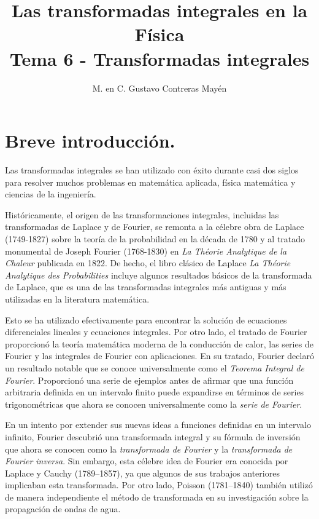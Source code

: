 
\usepackage{apacite}
\title{Las transformadas integrales en la Física \\ \large {Tema 6 - Transformadas integrales} \vspace{-3ex}}
\author{M. en C. Gustavo Contreras Mayén}
\date{ }

\vspace{-4cm}
\maketitle
\fontsize{14}{14}\selectfont
\tableofcontents
\newpage
\section{Breve introducción.}
Las transformadas integrales se han utilizado con éxito durante casi dos siglos para resolver muchos problemas en matemática aplicada, física matemática y ciencias de la ingeniería.
\par
Históricamente, el origen de las transformaciones integrales, incluidas las transformadas de Laplace y de Fourier, se remonta a la célebre obra de Laplace (1749-1827) sobre la teoría de la probabilidad en la década de 1780 y al tratado monumental de Joseph Fourier (1768-1830) en \emph{La Théorie Analytique de la Chaleur} publicada en 1822. De hecho, el libro clásico de Laplace \emph{La Théorie Analytique des Probabilities} incluye algunos resultados básicos de la transformada de Laplace, que es una de las transformadas integrales más antiguas y más utilizadas en la literatura matemática. 
\par
Esto se ha utilizado efectivamente para encontrar la solución de ecuaciones diferenciales lineales y ecuaciones integrales. Por otro lado, el tratado de Fourier proporcionó la teoría matemática moderna de la conducción de calor, las series de Fourier y las integrales de Fourier con aplicaciones. En su tratado, Fourier declaró un resultado notable que se conoce universalmente como el \emph{Teorema Integral de Fourier}. Proporcionó una serie de ejemplos antes de afirmar que una función arbitraria definida en un intervalo finito puede expandirse en términos de series trigonométricas que ahora se conocen universalmente como la \emph{serie de Fourier}.
\par
En un intento por extender sus nuevas ideas a funciones definidas en un intervalo infinito, Fourier descubrió una transformada integral y su fórmula de inversión que ahora se conocen como la \emph{transformada de Fourier} y la \emph{transformada de Fourier inversa}. Sin embargo, esta célebre idea de Fourier era conocida por Laplace y Cauchy (1789–1857), ya que algunos de sus trabajos anteriores implicaban esta transformada. Por otro lado, Poisson (1781–1840) también utilizó de manera independiente el método de transformada en su investigación sobre la propagación de ondas de agua.
